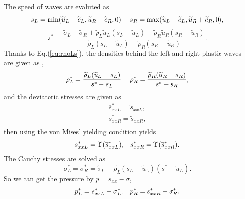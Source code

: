 \documentclass{article}
\numberwithin{equation}{section}
\numberwithin{table}{section}
\begin{document}
The speed of waves are evaluted as
\begin{equation}
  s_L = \text{min} (\widetilde{u}_L-\widetilde{c}_L, \widetilde{u}_R-\widetilde{c}_R,0), \hspace{0.3cm} s_R = \text{max}(\widetilde{u}_L+\widetilde{c}_L, \widetilde{u}_R+\widetilde{c}_R,0),
	\end{equation}
	\begin{equation}
	  s^* = \frac{\widetilde{\sigma}_L-\widetilde{\sigma}_R+\widetilde{\rho}_L \widetilde{u}_L(s_L-\widetilde{u}_L)-\widetilde{\rho}_R \widetilde{u}_R(s_R-\widetilde{u}_R)}{\widetilde{\rho}_L(s_L-\widetilde{u}_L)-\widetilde{\rho}_R(s_R-\widetilde{u}_R)}.
\end{equation}
Thanks to Eq.(\ref{eq:rhoLs}), the densities behind the left and right plastic waves are given as ,
\begin{equation}
  \rho_L^* = \frac{\widetilde{\rho}_L(\widetilde{u}_L-s_L)}{s^*-s_L}, \hspace{0.3cm}  \rho_R^* = \frac{\widetilde{\rho}_R(\widetilde{u}_R-s_R)}{s^*-s_R},
\end{equation}
and the deviatoric stresses are  given as
  \begin{align}
  \overline{s}_{xxL}^* =  \widetilde{s}_{xxL},\\
  \overline{s}_{xxR}^* =  \widetilde{s}_{xxR},\\
\end{align}
then using  the von Mises' yielding condition yields
\begin{equation}
  s_{xxL}^* = \Upsilon(\overline{s}_{xxL}^*) , \hspace{0.3cm}  s_{xxR}^* = \Upsilon(\overline{s}_{xxR}^*).
\end{equation}
The Cauchy stresses  are solved as
\begin{equation}
  \sigma_L^*=\sigma_R^*=\widetilde{\sigma}_L -\widetilde{\rho_L} (s_L-\widetilde{u}_L)(s^*-\widetilde{u}_L).
\end{equation}
So we can get the pressure by $p =s_{xx}-\sigma$,
\begin{equation}
  p_L^* = s_{xxL}^* - \sigma_L^*, \hspace{0.3cm}   p_R^* = s_{xxR}^* - \sigma_R^*.
\end{equation}
\end{document}
